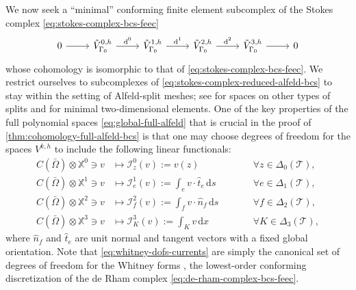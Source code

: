 \documentclass{mcom-l}
\theoremstyle{definition}
\theoremstyle{remark}
\numberwithin{equation}{section}
\newcommand{\unitvec}[1]{\hat{#1}}
\renewcommand{\d}[1]{\,\mathrm{d}{#1}}
\DeclareMathOperator{\dee}{d}
\newcommand{\mesh}[0]{\mathcal{T}}
\begin{document}
We now seek a ``minimal'' conforming finite element 
subcomplex of the Stokes complex \cref{eq:stokes-complex-bcs-feec}
\begin{equation}
	\label{eq:stokes-complex-reduced-alfeld-bcs}
	\begin{tikzcd}
		0 \arrow[r] 
		& \tilde{V}^{0, h}_{\Gamma_0} \arrow[r, "\dee^0"] 
		& \tilde{V}^{1, h}_{\Gamma_0} \arrow[r, "\dee^1"] 
		& \tilde{V}^{2, h}_{\Gamma_0} \arrow[r, "\dee^2"]
		& \tilde{V}^{3, h}_{\Gamma_0} \arrow[r]
		& 0
	\end{tikzcd}
\end{equation}
whose cohomology is isomorphic to that of \cref{eq:stokes-complex-bcs-feec}.
We restrict ourselves to subcomplexes of 
\cref{eq:stokes-complex-reduced-alfeld-bcs} to stay within the setting 
of Alfeld-split meshes; see \cite[Proposition 27]{ChristiansenHu18} for 
spaces on other types of splits and \cite[p. 343]{ChristiansenHu18} for 
minimal two-dimensional elements.
One of the key properties of the full polynomial spaces 
\cref{eq:global-full-alfeld} that is crucial in the proof of 
\cref{thm:cohomology-full-alfeld-bcs} is that one may choose
degrees of freedom for the spaces $V^{k, h}$ 
to include the following linear functionals:
\begin{subequations}
	\label{eq:whitney-dofs-currents}
	\begin{alignat}{2}
		C(\bar{\Omega}) \otimes \mathbb{X}^0 \ni v 
		&\mapsto \mathcal{I}_{z}^0(v) := v(z) \qquad 
		& &\forall z \in \Delta_0(\mesh), \\
		C(\bar{\Omega}) \otimes \mathbb{X}^1 \ni v 
		&\mapsto \mathcal{I}_{e}^1(v) := 
		\int_{e} v \cdot \unitvec{t}_e \d{s} \qquad 
		& &\forall e \in \Delta_1(\mesh), \\
		C(\bar{\Omega}) \otimes \mathbb{X}^2 \ni v 
		&\mapsto \mathcal{I}_{f}^2(v) := 
		\int_{f} v \cdot \unitvec{n}_f \d{s} \qquad 
		& &\forall f \in \Delta_2(\mesh), \\
		C(\bar{\Omega}) \otimes \mathbb{X}^3 \ni v 
		&\mapsto \mathcal{I}_{K}^3(v) := \int_{K} v \d{x} \qquad
		& &\forall K \in \Delta_3(\mesh),
	\end{alignat}
\end{subequations}
where $\unitvec{n}_f$ and $\unitvec{t}_e$ are unit normal and tangent vectors 
with a fixed global orientation. Note that \cref{eq:whitney-dofs-currents} 
are simply
the canonical set of degrees of freedom for the Whitney forms 
\cite{Bossavit88a,Bossavit88b,Whitney57},
the lowest-order conforming discretization of the de Rham complex 
\cref{eq:de-rham-complex-bcs-feec}.
\end{document}
